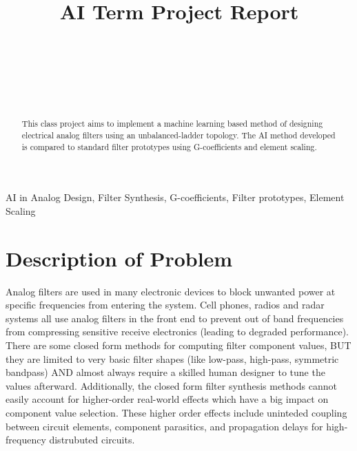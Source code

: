 \documentclass[10pt,conference]{IEEEtran}
\begin{document}
\title{AI Term Project Report\\
 \Large{} }

\author{
\\
\and
\IEEEauthorblockN{---, ---,}
\IEEEauthorblockA{--\\
---\\
---\\
---}\\ }
\vspace{-1in}

\maketitle



\begin{abstract}
This class project aims to implement a machine learning based method of designing electrical analog filters using an unbalanced-ladder topology. The AI method developed is compared to standard filter prototypes using G-coefficients and element scaling.




\end{abstract}
\renewcommand\IEEEkeywordsname{Keywords}
\begin{IEEEkeywords}
AI in Analog Design, Filter Synthesis, G-coefficients, Filter prototypes, Element Scaling
\end{IEEEkeywords}



\section{Description of Problem}


Analog filters are used in many electronic devices to block unwanted power at specific frequencies from entering the system. Cell phones, radios and radar systems all use analog filters in the front end to prevent out of band frequencies from compressing sensitive receive electronics (leading to degraded performance). There are some closed form methods for computing filter component values, BUT they are limited to very basic filter shapes (like low-pass, high-pass, symmetric bandpass) AND almost always require a skilled human designer to tune the values afterward. Additionally, the closed form filter synthesis methods cannot easily account for higher-order real-world effects which have a big impact on component value selection. These higher order effects include uninteded coupling between circuit elements, component parasitics, and propagation delays for high-frequency distrubuted circuits.
\end{document}

